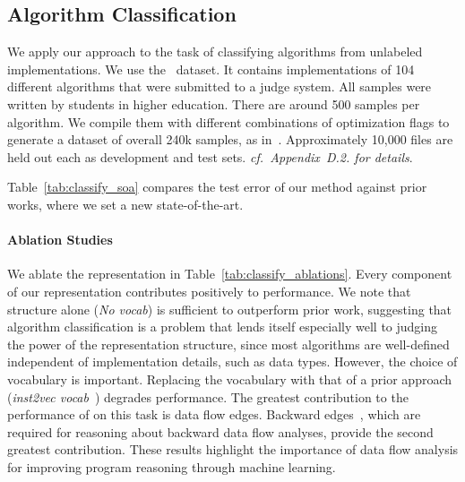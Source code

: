 \subsection{Algorithm Classification}

We apply our approach to the task of classifying algorithms from unlabeled
implementations. We use the~\citet{Mou2016} dataset. It contains implementations
of 104 different algorithms that were submitted to a judge system. All samples
were written by students in higher education. There are around 500 samples per
algorithm. We compile them with different combinations of optimization flags to
generate a dataset of overall 240k samples, as in~\citet{Ben-nun2018}.
Approximately 10,000 files are held out each as development and test sets.
\emph{cf.\ Appendix~D.2. for details}.

Table~\ref{tab:classify_soa} compares the test error of our method against prior
works, where we set a new state-of-the-art.

\paragraph{Ablation Studies} We ablate the \programl representation in
Table~\ref{tab:classify_ablations}. Every component of our representation
contributes positively to performance. We note that structure alone (\emph{No
vocab}) is sufficient to outperform prior work, suggesting that algorithm
classification is a problem that lends itself especially well to judging the
power of the representation structure, since most algorithms are well-defined
independent of implementation details, such as data types. However, the choice
of vocabulary is important. Replacing the \programl vocabulary with that of a
prior approach (\emph{inst2vec vocab}~\cite{Ben-nun2018}) degrades performance.
The greatest contribution to the performance of \programl on this task is data
flow edges. Backward edges~\cite{Li2015a}, which are required for reasoning
about backward data flow analyses, provide the second greatest contribution.
These results highlight the importance of data flow analysis for improving
program reasoning through machine learning.
